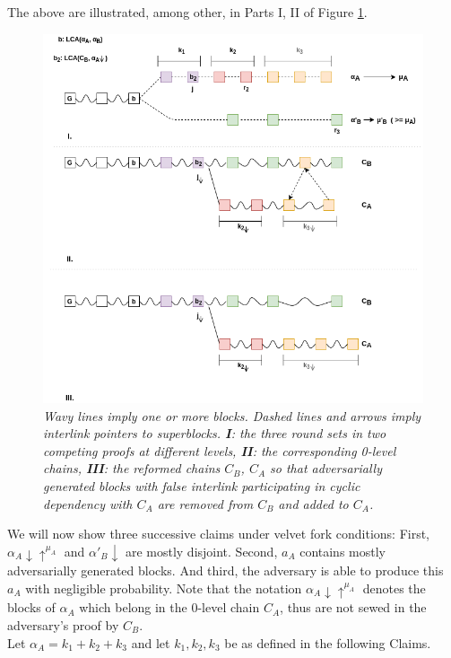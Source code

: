 \documentclass[11pt,a4paper]{article}
\begin{document}
The above are illustrated, among other, in Parts I, II of Figure \ref{fig:proof_velvet}.
\begin{figure}[h!]
	\begin{center}
		\includegraphics[scale=0.5]{figures/proof_velvet.png}
	\end{center}
	\caption{\textit{ Wavy lines imply one or more blocks. Dashed lines and arrows imply interlink pointers to superblocks. \textbf{I}: the three round sets in two competing proofs at different levels, \textbf{II}: the corresponding 0-level chains, \textbf{III}: the reformed chains $C_B$, $C_A$ so that adversarially generated blocks with false interlink participating in cyclic dependency with $C_A$ are removed from $C_B$ and added to $C_A$.}}
	\label{fig:proof_velvet}
\end{figure}
We will now show three successive claims under velvet fork conditions: First, $\alpha_A \downarrow \uparrow^{\mu_A}$ and $\alpha'_B \downarrow$ are mostly disjoint. Second, $a_A$ contains mostly adversarially generated blocks. And third, the adversary is able to produce this $a_A$ with negligible probability. Note that the notation $\alpha_A \downarrow \uparrow^{\mu_A}$ denotes the blocks of $\alpha_A$ which belong in the 0-level chain $C_A$, thus are not sewed in the adversary's proof by $C_B$.\\
Let $\alpha_A = k_1 + k_2 + k_3$ and let $k_1, k_2, k_3$ be as defined in the following Claims.\\
\end{document}
